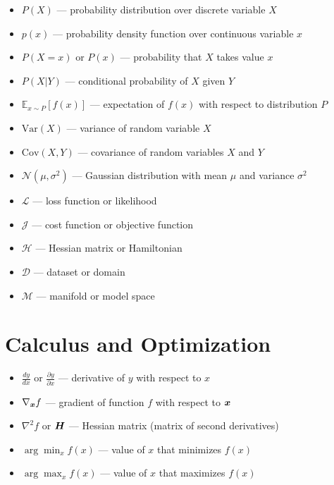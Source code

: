 \begin{itemize}[leftmargin=2em]
    \item $P(X)$ --- probability distribution over discrete variable $X$
    \item $p(x)$ --- probability density function over continuous variable $x$
    \item $P(X=x)$ or $P(x)$ --- probability that $X$ takes value $x$
    \item $P(X|Y)$ --- conditional probability of $X$ given $Y$
    \item $\mathbb{E}_{x \sim P}[f(x)]$ --- expectation of $f(x)$ with respect to distribution $P$
    \item $\text{Var}(X)$ --- variance of random variable $X$
    \item $\text{Cov}(X, Y)$ --- covariance of random variables $X$ and $Y$
    \item $\mathcal{N}(\mu, \sigma^2)$ --- Gaussian distribution with mean $\mu$ and variance $\sigma^2$
    \item $\mathcal{L}$ --- loss function or likelihood
    \item $\mathcal{J}$ --- cost function or objective function
    \item $\mathcal{H}$ --- Hessian matrix or Hamiltonian
    \item $\mathcal{D}$ --- dataset or domain
    \item $\mathcal{M}$ --- manifold or model space
\end{itemize}

\section*{Calculus and Optimization}

\begin{itemize}[leftmargin=2em]
    \item $\frac{dy}{dx}$ or $\frac{\partial y}{\partial x}$ --- derivative of $y$ with respect to $x$
    \item $\nabla_{\boldsymbol{x}} f$ --- gradient of function $f$ with respect to $\boldsymbol{x}$
    \item $\nabla^2 f$ or $\boldsymbol{H}$ --- Hessian matrix (matrix of second derivatives)
    \item $\arg\min_x f(x)$ --- value of $x$ that minimizes $f(x)$
    \item $\arg\max_x f(x)$ --- value of $x$ that maximizes $f(x)$
\end{itemize}

